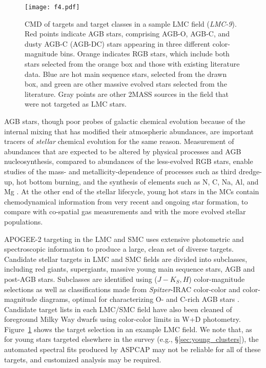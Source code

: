 \documentclass[12pt,twocolumn]{emulateapj}
\begin{document}
\begin{figure}[!hptb]
\begin{center}
\texttt{[image: f4.pdf]} %
\caption{
CMD of targets and target classes in a sample LMC field ({\it LMC-9}).  Red points indicate AGB stars, comprising AGB-O, AGB-C, and dusty AGB-C (AGB-DC) stars appearing in three different color-magnitude bins.  Orange indicates RGB stars, which include both stars selected from the orange box and those with existing literature data.  Blue are hot main sequence stars, selected from the drawn box, and green are other massive evolved stars selected from the literature.  Gray points are other 2MASS sources in the field that were not targeted as LMC stars.
}
\label{fig:magcloudcmd}
\end{center}
\end{figure}

AGB stars, though poor probes of galactic chemical evolution because of the internal mixing that has modified their atmospheric abundances, are important tracers of {\it stellar} chemical evolution for the same reason.  Measurement of abundances that are expected to be altered by physical processes and AGB nucleosynthesis, compared to abundances of the less-evolved RGB stars, enable studies of the mass- and metallicity-dependence of processes such as third dredge-up, hot bottom burning, and the synthesis of elements such as N, C, Na, Al, and Mg \citep[e.g.,][]{ventura15_agb,ventura16_agb}.  At the other end of the stellar lifecycle, young hot stars in the MCs contain chemodynamical information from very recent and ongoing star formation, to compare with co-spatial gas measurements and with the more evolved stellar populations.  

APOGEE-2 targeting in the LMC and SMC uses extensive photometric and spectroscopic information to produce a large, clean set of diverse targets.  
Candidate stellar targets in LMC and SMC fields are divided into subclasses, including red giants, supergiants, massive young main sequence stars, AGB and post-AGB stars.  Subclasses are identified using ($J-K_{S},H$) color-magnitude selections as well as classifications made from {\it Spitzer}-IRAC color-color and color-magnitude diagrams, optimal for characterizing O- and C-rich AGB stars \citep{dellagli_agb1,dellagli_agb2}.  Candidate target lists in each LMC/SMC field have also been cleaned of foreground Milky Way dwarfs using color-color limits in W+D photometry.  Figure~\ref{fig:magcloudcmd} shows the target selection in an example LMC field.  We note that, as for young stars targeted elsewhere in the survey (e.g., \S\ref{sec:young_clusters}), the automated spectral fits produced by ASPCAP may not be reliable for all of these targets, and customized analysis may be required.
\end{document}
